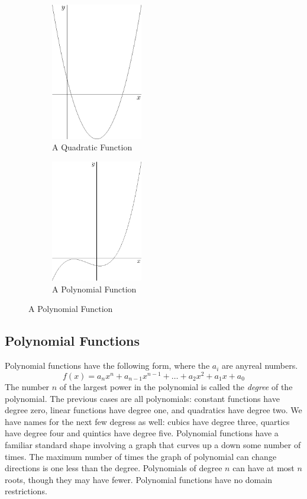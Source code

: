 \documentclass[fleqn]{report}
\begin{document}
\begin{figure}[ht]
\centering
\begin{subfigure}{.5\textwidth}
 \centering
 \includegraphics[width=4cm]{figure33.eps}
 \caption{A Quadratic Function}
\end{subfigure}%
\begin{subfigure}{.5\textwidth}
 \centering
 \includegraphics[width=4cm]{figure28.eps}
 \caption{A Polynomial Function}
\end{subfigure}
\label{figure-types-of-functions2}
\end{figure}

\subsection{Polynomial Functions}
\label{polynomials}

Polynomial functions have the following form, where the $a_i$
are anyreal numbers.
\begin{equation*}
f(x) = a_nx^n + a_{n-1}x^{n-1} + \ldots + a_2x^2 + a_1 x + a_0
\end{equation*}
The number $n$ of the largest power in the polynomial is
called the \emph{degree} of the polynomial. The previous
cases are all polynomials: constant functions have degree
zero, linear functions have degree one, and quadratics have
degree two. We have names for the next few degress as well:
cubics have degree three, quartics have degree four and
quintics have degree five. Polynomial functions have a
familiar standard shape involving a graph that curves up a
down some number of times. The maximum number of times the
graph of polynomial can change directions is one less than the
degree. Polynomials of degree $n$ can have at most $n$ roots,
though they may have fewer. Polynomial functions have no
domain restrictions. 
\end{document}
